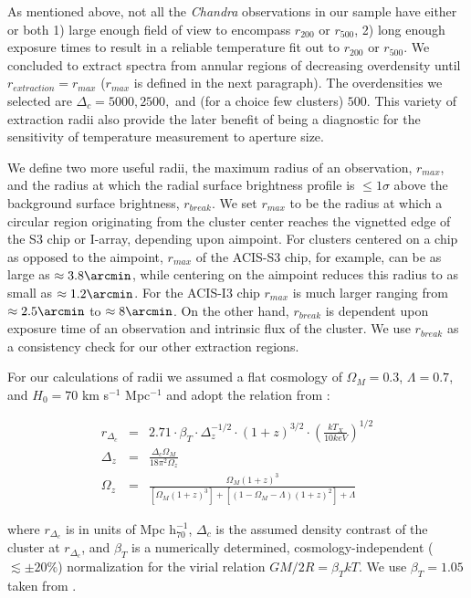 \documentclass[12pt, preprint]{aastex}
\begin{document}
As mentioned above, not all the {\textit{Chandra}} observations in our sample have
either or both 1) large enough field of view to encompass $r_{200}$ or
$r_{500}$, 2) long enough exposure times to result in a reliable
temperature fit out to $r_{200}$ or $r_{500}$. We concluded to
extract spectra from annular regions of decreasing overdensity until $r_{extraction} =
r_{max}$ ($r_{max}$ is defined in the next paragraph). The overdensities we
selected are $\Delta_c = 5000, 2500,$ and (for a choice few clusters) $500$. This variety of
extraction radii also provide the later benefit
of being a diagnostic for the sensitivity of temperature measurement to aperture size.

We define two more useful radii, the maximum radius of an observation,
$r_{max}$, and the radius at which the radial surface brightness profile
is $\le 1\sigma$ above the background surface brightness, $r_{break}$. We set
$r_{max}$ to be the radius at which a circular region originating from
the cluster center reaches the vignetted edge of the S3 chip or
I-array, depending upon aimpoint. For clusters centered on a chip as
opposed to the aimpoint, $r_{max}$ of the ACIS-S3 chip, for
example, can be as large as $\approx 3.8\arcmin$,
while centering on the aimpoint reduces this radius to as small as
$\approx 1.2\arcmin$. For the ACIS-I3 chip $r_{max}$ is much
larger ranging from $\approx 2.5\arcmin$ to $\approx 8\arcmin$. On the
other hand, $r_{break}$ is dependent upon exposure time of an observation
and intrinsic flux of the cluster. We use $r_{break}$ as a consistency
check for our other extraction regions.

For our calculations of radii we assumed a flat cosmology of
$\Omega_{M} = 0.3$, $\Lambda = 0.7$, and $H_{0} = 70$ km s$^{-1}$ Mpc$^{-1}$
and adopt the relation from \cite{2002A&A...389....1A}:

\begin{eqnarray}
r_{\Delta_c} &=& 2.71
\cdot \beta_T
\cdot \Delta_z^{-1/2}
\cdot (1+z)^{3/2}
\cdot (\frac{kT_X}{10keV})^{1/2}\\
\Delta_z &=& \frac{\Delta_c \Omega_M}{18\pi^2\Omega_z} \nonumber \\
\Omega_z &=& \frac{\Omega_M (1+z)^3}{[\Omega_M (1+z)^3]+[(1-\Omega_M-\Lambda)(1+z)^2]+\Lambda} \nonumber
\end{eqnarray}

where $r_{\Delta_c}$ is in units of Mpc h$_{70}^{-1}$, $\Delta_c$ is
the assumed density contrast of the cluster at $r_{\Delta_c}$, and
$\beta_T$ is a numerically determined, cosmology-independent ($\lesssim \pm 20\%$)
normalization for the virial relation
$GM/2R = \beta_TkT$. We use $\beta_T = 1.05$ taken from \cite{1996ApJ...469..494E}.
\end{document}
